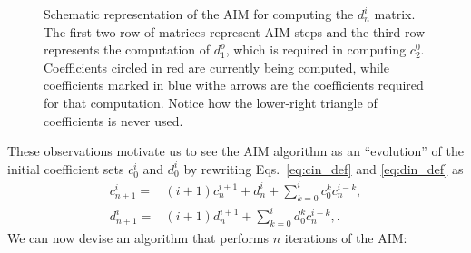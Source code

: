 \begin{figure}[!ht]
  \centering
  
  \caption{Schematic representation of the AIM for computing the $d^i_n$ matrix. The first two row of matrices represent AIM steps and the third row represents the computation of $d^o_1$, which is required in computing $c^0_2$. Coefficients circled in red are currently being computed, while coefficients marked in blue withe arrows are the coefficients required for that computation. Notice how the lower-right triangle of coefficients is never used.}
  \label{fig:aim_coeffs_d}
\end{figure}

These observations motivate us to see the AIM algorithm as an ``evolution'' of the initial coefficient sets $c^i_0$ and $d^i_0$ by rewriting Eqs.~\eqref{eq:cin_def} and \eqref{eq:din_def} as
%
\begin{align}
  c^i_{n+1} = & (i+1)c^{i+1}_n + d^i_n + \sum_{k=0}^{i}c^k_0c^{i-k}_n, \label{eq:cin_iterative} \\
  d^i_{n+1} = & (i+1)d^{i+1}_n + \sum_{k=0}^{i}d^k_0c^{i-k}_n, \label{eq:din_iterative}
  .
\end{align}
%
We can now devise an algorithm that performs $n$ iterations of the AIM:
%

